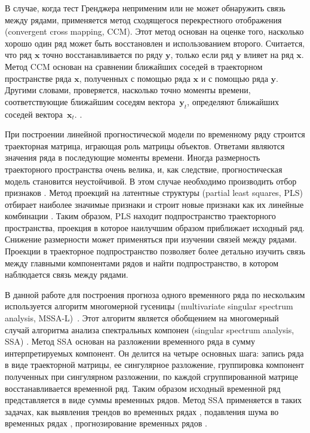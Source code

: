 \documentclass[14pt]{article}
\newcommand{\bx}{\mathbf{x}}
\newcommand{\by}{\mathbf{y}}
\begin{document}
В случае, когда тест Гренджера неприменим или не может обнаружить связь между рядами, применяется метод сходящегося перекрестного отображения (convergent cross mapping, CCM). Этот метод основан на оценке того, насколько хорошо один ряд может быть восстановлен и использованием второго. Считается, что ряд $\bx$ точно восстанавливается по ряду $\by$, только если ряд $\by$ влияет на ряд $\bx$. Метод CCM основан на сравнении ближайших соседей в траекторном пространстве ряда $\bx$, полученных с помощью ряда $\bx$ и с помощью ряда $\by$. Другими словами, проверяется, насколько точно моменты времени, соответствующие ближайшим соседям вектора~$\by_t$, определяют ближайших соседей вектора~$\bx_t$.
\cite{sugihara2012detecting, sugihara1990nonlinear}.

При построении  линейной прогностической модели по временному ряду строится траекторная  матрица, играющая роль матрицы объектов.  Ответами являются значения ряда в последующие моменты времени. Иногда размерность траекторного пространства очень велика, и, как следствие,  прогностическая модель становится неустойчивой. В этом случае необходимо производить отбор признаков \cite{katrutsa2015stress, li2017feature}. Метод проекций на латентные структуры (partial least squares, PLS) отбирает наиболее значимые признаки и строит новые признаки как их линейные комбинации \cite{geladi1988notes, hoskuldsson1988pls}. Таким образом, PLS находит подпространство траекторного пространства, проекция в которое наилучшим образом приближает исходный ряд. 
Снижение размерности может применяться при изучении связей между рядами.
Проекции в траекторное подпространство позволяет более детально изучить связь между главными компонентами рядов и найти подпространство, в котором наблюдается связь между рядами.

В данной работе для построения прогноза одного временного ряда по нескольким используется алгоритм многомерной гусеницы (multivariate singular spectrum analysis, MSSA-L)~\cite{golyandina2005ssa}. 
Этот алгоритм является обобщением на многомерный случай алгоритма анализа спектральных компонен (singular spectrum analysis, SSA) \cite{golyandina2001analysis, golyandina2013singular, elsner2013singular}. 
Метод SSA основан на разложении временного ряда в сумму интерпретируемых компонент. Он делится на четыре основных шага: запись ряда в виде траекторной  матрицы, ее сингулярное разложение, группировка компонент полученных при сингулярном разложении, по каждой сгруппированной матрице восстанавливается временной ряд. Таким образом исходный временной ряд представляется в виде суммы временных рядов.
Метод SSA применяется в таких задачах, как выявления трендов  во временных рядах \cite{alexandrov2008method}, подавления шума во временных рядах \cite{allen1996monte}, прогнозирование временных рядов \cite{hassani2013forecasting, marques2006singular}. 
\end{document}
